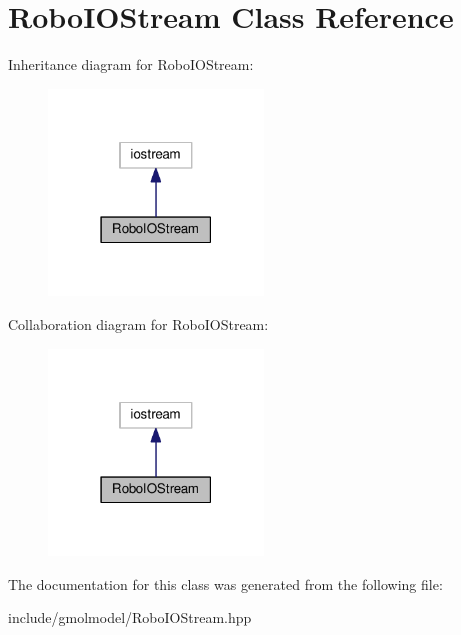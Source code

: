 \hypertarget{classRoboIOStream}{}\section{Robo\+I\+O\+Stream Class Reference}
\label{classRoboIOStream}


Inheritance diagram for Robo\+I\+O\+Stream\+:\nopagebreak
\begin{figure}[H]
\begin{center}
\leavevmode
\includegraphics[width=162pt]{classRoboIOStream__inherit__graph}
\end{center}
\end{figure}


Collaboration diagram for Robo\+I\+O\+Stream\+:\nopagebreak
\begin{figure}[H]
\begin{center}
\leavevmode
\includegraphics[width=162pt]{classRoboIOStream__coll__graph}
\end{center}
\end{figure}


The documentation for this class was generated from the following file\+:\begin{DoxyCompactItemize}
\item 
include/gmolmodel/Robo\+I\+O\+Stream.\+hpp\end{DoxyCompactItemize}
